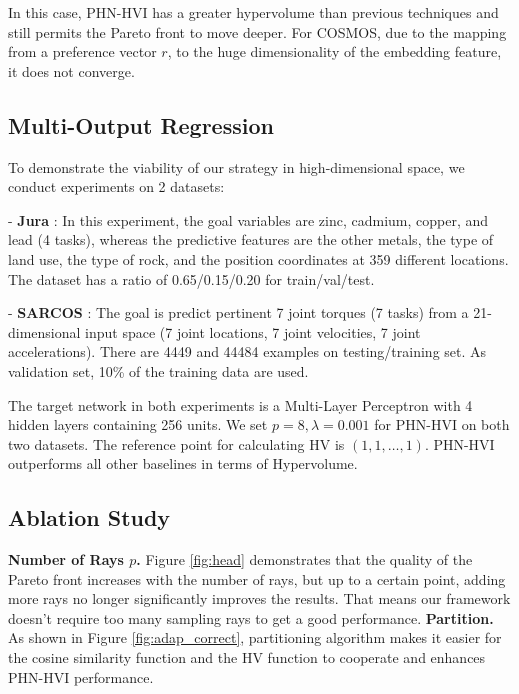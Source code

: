\documentclass[letterpaper]{article} %
\newcommand{\ourmodel}{PHN-HVI }
\begin{document}
In this case, \ourmodel has a greater hypervolume than previous techniques and still permits the Pareto front to move deeper. For COSMOS, due to the mapping from a preference vector $r$, to the huge dimensionality of the embedding feature, it does not converge.

\subsection{Multi-Output Regression}
To demonstrate the viability of our strategy in high-dimensional space, we conduct experiments on 2 datasets:

\indent - \textbf{Jura} \cite{Goovaerts1997}: In this experiment, the goal variables are zinc, cadmium, copper, and lead (4 tasks), whereas the predictive features are the other metals, the type of land use, the type of rock, and the position coordinates at 359 different locations. The dataset has a ratio of 0.65/0.15/0.20 for train/val/test.

\indent - \textbf{SARCOS} \cite{Sethu2000}:  The goal is predict pertinent 7 joint torques (7 tasks) from a 21-dimensional input space (7 joint locations, 7 joint velocities, 7 joint accelerations). There are 4449 and 44484 examples on testing/training set. As validation set, 10\% of the training data are used. 

The target network in both experiments is a Multi-Layer Perceptron with 4 hidden layers containing 256 units. We set $p=8, \lambda=0.001$ for \ourmodel on both two datasets. The reference point for calculating HV is $(1, 1, \dots, 1)$. \ourmodel outperforms all other baselines in terms of Hypervolume. 

\subsection{Ablation Study}
\textbf{Number of Rays $p$.} Figure \ref{fig:head} demonstrates that the quality of the Pareto front increases with the number of rays, but up to a certain point, adding more rays no longer significantly improves the results. That means our framework doesn't require too many sampling rays to get a good performance. 
\indent \textbf{Partition.} As shown in Figure \ref{fig:adap_correct}, partitioning algorithm makes it easier for the cosine similarity function and the HV function to cooperate and enhances \ourmodel performance.
\end{document}

